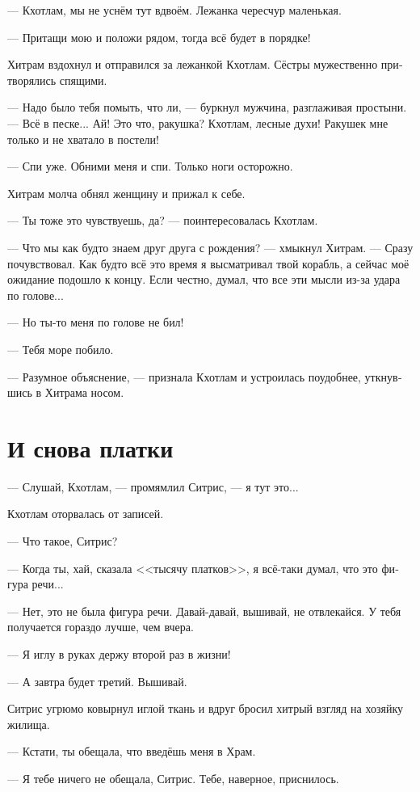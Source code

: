 \documentclass[a4paper,12pt,fleqn]{book}\usepackage{polyglossia}\setdefaultlanguage[babelshorthands=true]{russian}\setotherlanguage{english}\defaultfontfeatures{Ligatures=TeX,Mapping=tex-text}\usepackage{xcolor}\newcommand{\ml}[3]{#2}
\newcommand{\Sitris}{S\~{\i}tr\v{\i}s}
\begin{document}
--- Кхотлам, мы не уснём тут вдвоём.
Лежанка чересчур маленькая.

--- Притащи мою и положи рядом, тогда всё будет в порядке!

Хитрам вздохнул и отправился за лежанкой Кхотлам.
Сёстры мужественно притворялись спящими.

--- Надо было тебя помыть, что ли, --- буркнул мужчина, разглаживая простыни.
--- Всё в песке...
Ай!
Это что, ракушка?
Кхотлам, лесные духи!
Ракушек мне только и не хватало в постели!

--- Спи уже.
Обними меня и спи.
Только ноги осторожно.

Хитрам молча обнял женщину и прижал к себе.

--- Ты тоже это чувствуешь, да? --- поинтересовалась Кхотлам.

--- Что мы как будто знаем друг друга с рождения? --- хмыкнул Хитрам.
--- Сразу почувствовал.
Как будто всё это время я высматривал твой корабль, а сейчас моё ожидание подошло к концу.
Если честно, думал, что все эти мысли из-за удара по голове...

--- Но ты-то меня по голове не бил!

--- Тебя море побило.

--- Разумное объяснение, --- признала Кхотлам и устроилась поудобнее, уткнувшись в Хитрама носом.

\section{И снова платки}

--- Слушай, Кхотлам, --- промямлил Ситрис, --- я тут это...

Кхотлам оторвалась от записей.

--- Что такое, Ситрис?

--- Когда ты, хай, сказала <<тысячу платков>>, я всё-таки думал, что это фигура речи...

--- Нет, это не была фигура речи.
Давай-давай, вышивай, не отвлекайся.
У тебя получается гораздо лучше, чем вчера.

--- Я иглу в руках держу второй раз в жизни!

--- А завтра будет третий.
Вышивай.

Ситрис угрюмо ковырнул иглой ткань и вдруг бросил хитрый взгляд на хозяйку жилища.

--- Кстати, ты обещала, что введёшь меня в Храм.

\ml{$0$}
{--- Я тебе ничего не обещала, Ситрис.}
{``I promised nothing, \Sitris.}
\ml{$0$}
{Тебе, наверное, приснилось.}
{Maybe you dreamt it.''}
\end{document}
